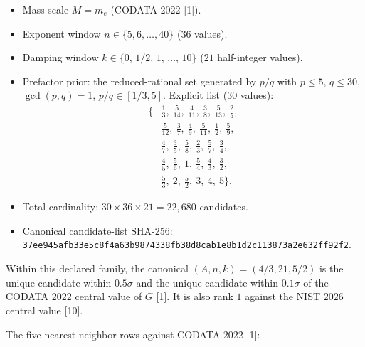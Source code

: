 \documentclass[
  11pt,
  letterpaper,
  twocolumn,
]{article}
\providecommand{\tightlist}{%
  \setlength{\itemsep}{0pt}\setlength{\parskip}{0pt}}
\providecommand{\tightlist}{\setlength{\itemsep}{0pt}\setlength{\parskip}{0pt}}
\begin{document}
\begin{itemize}
\tightlist
\item
  Mass scale \(M = m_e\) (CODATA 2022 {[}1{]}).
\item
  Exponent window \(n \in \{5,6,\dots,40\}\) (\(36\) values).
\item
  Damping window \(k \in \{0,\,1/2,\,1,\,\dots,\,10\}\) (\(21\)
  half-integer values).
\item
  Prefactor prior: the reduced-rational set generated by \(p/q\) with
  \(p\!\le\!5\), \(q\!\le\!30\), \(\gcd(p,q)\!=\!1\),
  \(p/q\!\in\![1/3,5]\). Explicit list (30 values):
  \begin{equation*}
  \begin{aligned}
  \{ &\tfrac{1}{3},\ \tfrac{5}{14},\ \tfrac{4}{11},\ \tfrac{3}{8},\ \tfrac{5}{13},\ \tfrac{2}{5}, \\
  &\tfrac{5}{12},\ \tfrac{3}{7},\ \tfrac{4}{9},\ \tfrac{5}{11},\ \tfrac{1}{2},\ \tfrac{5}{9}, \\
  &\tfrac{4}{7},\ \tfrac{3}{5},\ \tfrac{5}{8},\ \tfrac{2}{3},\ \tfrac{5}{7},\ \tfrac{3}{4}, \\
  &\tfrac{4}{5},\ \tfrac{5}{6},\ 1,\ \tfrac{5}{4},\ \tfrac{4}{3},\ \tfrac{3}{2}, \\
  &\tfrac{5}{3},\ 2,\ \tfrac{5}{2},\ 3,\ 4,\ 5 \}.
  \end{aligned}
  \end{equation*}
\item
  Total cardinality: \(30 \times 36 \times 21 = 22{,}680\) candidates.
\item
  Canonical candidate-list SHA-256:
  \texttt{\small 37ee945afb33e5c8\allowbreak f4a63b9874338fb3\allowbreak 8d8cab1e8b1d2c11\allowbreak 3873a2e632ff92f2}.
\end{itemize}

Within this declared family, the canonical \((A,n,k) = (4/3,21,5/2)\) is
the unique candidate within \(0.5\sigma\) and the unique candidate
within \(0.1\sigma\) of the CODATA 2022 central value of \(G\) {[}1{]}.
It is also rank \(1\) against the NIST 2026 central value {[}10{]}.

The five nearest-neighbor rows against CODATA 2022 {[}1{]}:
\end{document}
